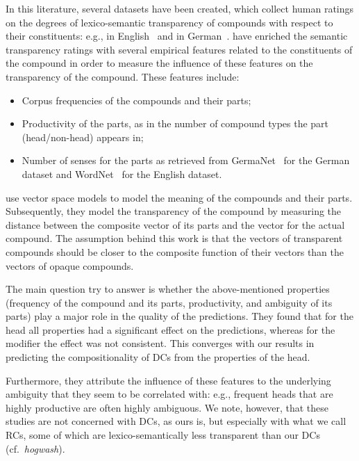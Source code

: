 \documentclass[output=paper]{langsci/langscibook}
\begin{document}
 {In this literature, several datasets have been created, which collect human ratings on the degrees of lexico-semantic transparency of compounds with respect to their constituents: e.g., in English~\citep{Reddy:2011,Juhaszetal:2015} and in German~\citep{SchulteImWaldeEtAl:16a}.} 
\cite{SchulteImWaldeEtAl:16a} have enriched the semantic transparency ratings with several empirical features related to the  {constituents} of the compound in order to measure the influence of these features on the  {transparency} of the compound. These features include:
\begin{itemize}
\item Corpus frequencies of the compounds and their parts;
\item Productivity of the parts, as in the number of compound types the part (head/non-head) appears in;
\item Number of senses for the parts as retrieved from GermaNet~\citep{hamp:97,heinrich:10} for the German dataset and WordNet~\citep{fellbaum:98} for the English dataset.
\end{itemize}

\cite{SchulteImWaldeEtAl:16} use vector space models to model the meaning of the compounds and their parts. Subsequently, they model the  {transparency} of the compound by measuring the distance between the composite vector of its parts and the vector for the actual compound. The assumption behind this work is that the vectors of  {transparent} compounds should be closer to the composite function of their vectors than the vectors of  {opaque} compounds. 

The main question \cite{SchulteImWaldeEtAl:16} try to answer  
is whether the above-mentioned properties (frequency of the compound and its parts, productivity, and ambiguity of its parts) play a major role in the  quality of the predictions. They found that for the head all properties had a significant effect on the predictions, whereas for the modifier the effect was not consistent. This converges with our results in predicting the compositionality of DCs from the properties of the head.

Furthermore, they attribute the influence of these features to the underlying  ambiguity that they seem to be correlated with: e.g., frequent heads that are highly productive are often highly ambiguous.  {We note, however, that these studies are not  concerned with DCs, as ours is, but especially with what we call RCs, some of which are lexico-semantically less transparent than our DCs (cf.~\textit{hogwash}).}
\end{document}
